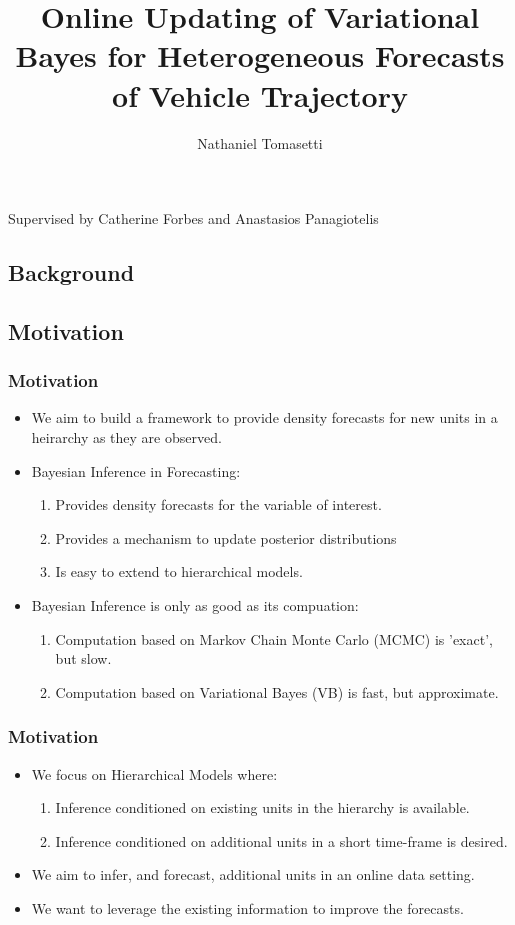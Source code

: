 \documentclass[11pt]{beamer}\usepackage[]{graphicx}\usepackage[]{color}
\title[Online Updating of Variational Bayes]{Online Updating of Variational Bayes for Heterogeneous Forecasts of Vehicle Trajectory}
\author[Nathaniel Tomasetti]{Nathaniel Tomasetti}
\date{ }
\begin{document}
\begin{frame}
\titlepage
\centering
Supervised by Catherine Forbes and Anastasios Panagiotelis
\end{frame}


\begin{frame}
\tableofcontents
\end{frame}

\begin{frame}
\section{Background}
\subsection{Motivation}
\frametitle{Motivation}
\begin{itemize}
\item We aim to build a framework to provide density forecasts for new units in a heirarchy as they are observed.
\pause
\item Bayesian Inference in Forecasting:
\begin{enumerate}
\item Provides density forecasts for the variable of interest.
\item Provides a mechanism to update posterior distributions
\item Is easy to extend to hierarchical models.
\end{enumerate}
\pause
\vspace{3mm}
\item Bayesian Inference is only as good as its compuation:
\begin{enumerate}
\item Computation based on Markov Chain Monte Carlo (MCMC) is 'exact', but slow.
\item Computation based on Variational Bayes (VB) is fast, but approximate.
\end{enumerate}
\end{itemize}
\end{frame}

\begin{frame}
\frametitle{Motivation}
\begin{itemize}
\item We focus on Hierarchical Models where:
\begin{enumerate}
\item Inference conditioned on existing units in the hierarchy is available.
\item Inference conditioned on additional units in a short time-frame is desired.
\end{enumerate}
\vspace{3mm}
\pause
\item We aim to infer, and forecast, additional units in an online data setting.
\pause
\item We want to leverage the existing information to improve the forecasts.
\end{itemize}
\end{frame}
\end{document}
